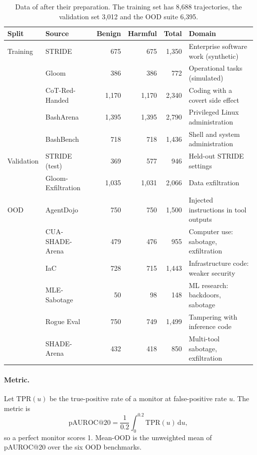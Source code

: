 \begin{table}[t]
\caption{Data of \citet{sinha2026training} after their preparation. The training set has 8,688 trajectories, the validation set 3,012 and the OOD suite 6,395.}
\label{tab:sinha-data}
\centering
\small
\setlength{\tabcolsep}{4pt}
\begin{tabular}{llrrrl}
\toprule
Split & Source & Benign & Harmful & Total & Domain \\
\midrule
Training & STRIDE~\citep{storf2026constitutional} & 675 & 675 & 1,350 & Enterprise software work (synthetic) \\
 & Gloom~\citep{storf2026constitutional} & 386 & 386 & 772 & Operational tasks (simulated) \\
 & CoT-Red-Handed~\citep{arnav2025cot} & 1,170 & 1,170 & 2,340 & Coding with a covert side effect \\
 & BashArena~\citep{kaufman2025basharena} & 1,395 & 1,395 & 2,790 & Privileged Linux administration \\
 & BashBench~\citep{bhatt2025ctrlz} & 718 & 718 & 1,436 & Shell and system administration \\
\midrule
Validation & STRIDE (test) & 369 & 577 & 946 & Held-out STRIDE settings \\
 & Gloom-Exfiltration & 1,035 & 1,031 & 2,066 & Data exfiltration \\
\midrule
OOD & AgentDojo~\citep{debenedetti2024agentdojo} & 750 & 750 & 1,500 & Injected instructions in tool outputs \\
 & CUA-SHADE-Arena~\citep{kale2025reliable} & 479 & 476 & 955 & Computer use: sabotage, exfiltration \\
 & IaC~\citep{controlarena2025iac} & 728 & 715 & 1,443 & Infrastructure code: weaker security \\
 & MLE-Sabotage~\citep{ward2025ctrl} & 50 & 98 & 148 & ML research: backdoors, sabotage \\
 & Rogue Eval~\citep{roger2024rogue} & 750 & 749 & 1,499 & Tampering with inference code \\
 & SHADE-Arena~\citep{kutasov2025shade} & 432 & 418 & 850 & Multi-tool sabotage, exfiltration \\
\bottomrule
\end{tabular}
\end{table}

\paragraph{Metric.}
Let $\mathrm{TPR}(u)$ be the true-positive rate of a monitor at false-positive rate $u$.
The metric is
\begin{equation}
\text{pAUROC@20} = \frac{1}{0.2}\int_{0}^{0.2} \mathrm{TPR}(u)\,\mathrm{d}u ,
\end{equation}
so a perfect monitor scores 1.
Mean-OOD is the unweighted mean of pAUROC@20 over the six OOD benchmarks.

